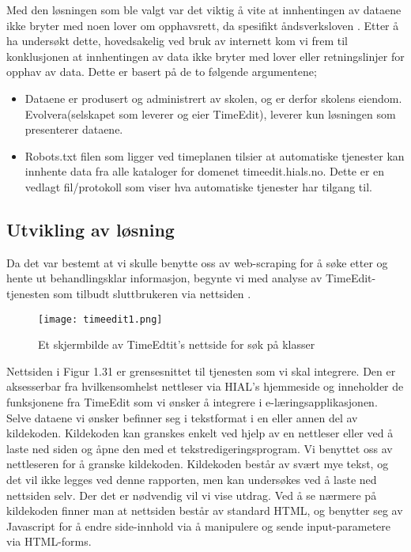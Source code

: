 \documentclass[../main.tex]{subfiles}
\begin{document}
Med den løsningen som ble valgt var det viktig å vite at innhentingen av dataene ikke bryter med noen lover om opphavsrett, da spesifikt åndsverksloven .
Etter å ha undersøkt dette, hovedsakelig ved bruk av internett kom vi frem til konklusjonen at innhentingen av data ikke bryter med lover eller retningslinjer for opphav av data. Dette er basert på de to følgende argumentene;

\begin{itemize}
\item Dataene er produsert og administrert av skolen, og er derfor skolens eiendom. Evolvera(selskapet som leverer og eier TimeEdit), leverer kun løsningen som presenterer dataene.
\item Robots.txt filen som ligger ved timeplanen tilsier at automatiske tjenester kan innhente data fra alle kataloger for domenet timeedit.hials.no. Dette er en vedlagt fil/protokoll som viser hva automatiske tjenester har tilgang til.
\end{itemize}



\subsection{Utvikling av løsning}

Da det var bestemt at vi skulle benytte oss av web-scraping for å søke etter og hente ut behandlingsklar informasjon, begynte vi med analyse av TimeEdit-tjenesten som tilbudt sluttbrukeren via nettsiden .

\begin{figure}[H]
  \centering
  \texttt{[image: timeedit1.png]}
\caption{Et skjermbilde av TimeEdtit’s nettside for søk på klasser}
\label{fig:TimeEditMain}
\end{figure}
Nettsiden i Figur 1.31 er grensesnittet til tjenesten som vi skal integrere. Den er aksesserbar fra hvilkensomhelst nettleser via HIAL's hjemmeside  og inneholder de funksjonene fra TimeEdit som vi ønsker å integrere i e-læringsapplikasjonen. Selve dataene vi ønsker befinner seg i tekstformat i en eller annen del av kildekoden. Kildekoden kan granskes enkelt ved hjelp av en nettleser eller ved å laste ned siden og åpne den med et tekstredigeringsprogram. Vi benyttet oss av nettleseren for å granske kildekoden. Kildekoden består av svært mye tekst, og det vil ikke legges ved denne rapporten, men kan undersøkes ved å laste ned nettsiden selv. Der det er nødvendig vil vi vise utdrag.\newline
\newline
Ved å se nærmere på kildekoden finner man at nettsiden består av standard HTML, og benytter seg av Javascript for å endre side-innhold via å manipulere og sende input-parametere via HTML-forms. 
\end{document}
